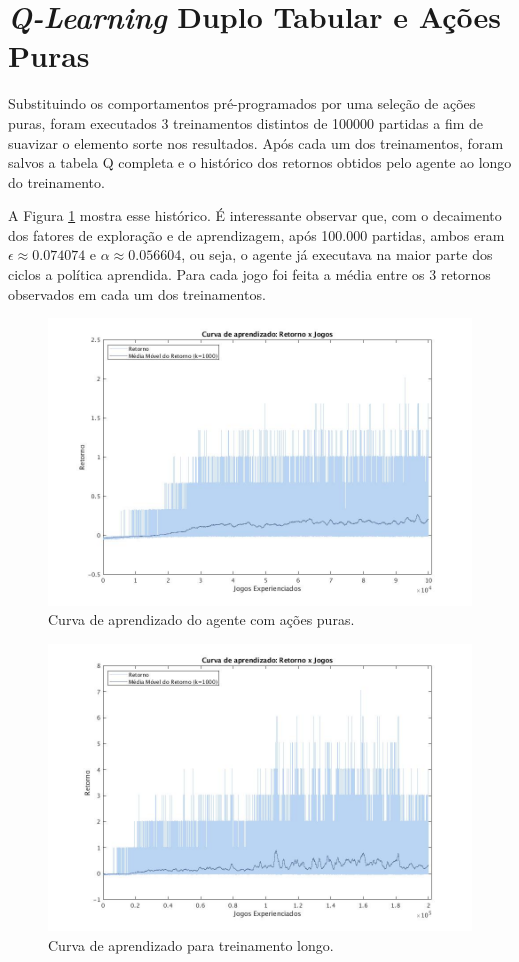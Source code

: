 \section{\textit{Q-Learning} Duplo Tabular e Ações Puras}

Substituindo os comportamentos pré-programados por uma seleção de ações puras, foram executados 3 treinamentos distintos de 100000 partidas a fim de suavizar o elemento sorte nos resultados. Após cada um dos treinamentos, foram salvos a tabela Q completa e o histórico dos retornos obtidos pelo agente ao longo do treinamento.

A Figura \ref{fig:single-agent-curva} mostra esse histórico. É interessante observar que, com o decaimento dos fatores de exploração e de aprendizagem, após 100.000 partidas, ambos eram $\epsilon \approx 0.074074$ e $\alpha \approx 0.056604$, ou seja, o agente já executava na maior parte dos ciclos a política aprendida. Para cada jogo foi feita a média entre os 3 retornos observados em cada um dos treinamentos.

\begin{figure}[H]
	\includegraphics[width=0.93\linewidth]{figs/curva-qtabular.jpg}
	\centering
	\caption{Curva de aprendizado do agente com ações puras. }
	\label{fig:single-agent-curva}
\end{figure}

\begin{figure}[H]
	\includegraphics[width=0.93\linewidth]{figs/curvalonga-qtabular.jpg}
	\centering
	\caption{Curva de aprendizado para treinamento longo.}
	\label{fig:single-agent-curvalonga}
\end{figure}

